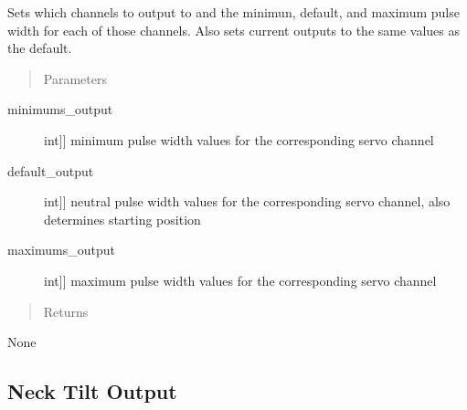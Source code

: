 \documentclass[letterpaper,10pt,english]{sphinxmanual}
\begin{document}
\begin{fulllineitems}
\begin{fulllineitems}
\end{fulllineitems}


\begin{fulllineitems}
\label{\detokenize{specific:SideLipOutput.SideLipOutput.set_outputs}}
\sphinxAtStartPar
Sets which channels to output to and the minimun, default, and maximum pulse width for each of those channels.
Also sets current outputs to the same values as the default.
\begin{quote}\begin{description}
\item[{Parameters}] \leavevmode
\end{description}\end{quote}
\begin{description}
\item[{minimums\_output}] \leavevmode{[}{[}int{]}{]}
\sphinxAtStartPar
minimum pulse width values for the corresponding servo channel

\item[{default\_output}] \leavevmode{[}{[}int{]}{]}
\sphinxAtStartPar
neutral pulse width values for the corresponding servo channel, also determines starting position

\item[{maximums\_output}] \leavevmode{[}{[}int{]}{]}
\sphinxAtStartPar
maximum pulse width values for the corresponding servo channel

\end{description}
\begin{quote}\begin{description}
\item[{Returns}] \leavevmode
\end{description}\end{quote}

\sphinxAtStartPar
None

\end{fulllineitems}


\end{fulllineitems}



\subsection{Neck Tilt Output}
\label{\detokenize{specific:module-NeckTiltOutput}}\label{\detokenize{specific:neck-tilt-output}}
\end{document}
